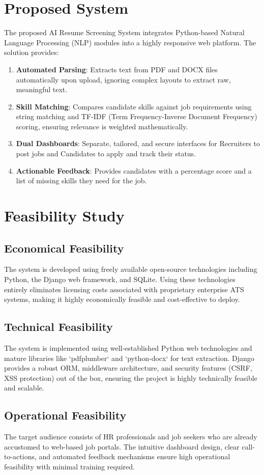 \documentclass[12pt,a4paper]{report}
\begin{document}
\section{Proposed System}
The proposed AI Resume Screening System integrates Python-based Natural Language Processing (NLP) modules into a highly responsive web platform. The solution provides:
\begin{enumerate}
\item \textbf{Automated Parsing}: Extracts text from PDF and DOCX files automatically upon upload, ignoring complex layouts to extract raw, meaningful text.
\item \textbf{Skill Matching}: Compares candidate skills against job requirements using string matching and TF-IDF (Term Frequency-Inverse Document Frequency) scoring, ensuring relevance is weighted mathematically.
\item \textbf{Dual Dashboards}: Separate, tailored, and secure interfaces for Recruiters to post jobs and Candidates to apply and track their status.
\item \textbf{Actionable Feedback}: Provides candidates with a percentage score and a list of missing skills they need for the job.
\end{enumerate}

\section{Feasibility Study}
\subsection{Economical Feasibility}
The system is developed using freely available open-source technologies including Python, the Django web framework, and SQLite. Using these technologies entirely eliminates licensing costs associated with proprietary enterprise ATS systems, making it highly economically feasible and cost-effective to deploy.
\subsection{Technical Feasibility}
The system is implemented using well-established Python web technologies and mature libraries like `pdfplumber` and `python-docx` for text extraction. Django provides a robust ORM, middleware architecture, and security features (CSRF, XSS protection) out of the box, ensuring the project is highly technically feasible and scalable.
\subsection{Operational Feasibility}
The target audience consists of HR professionals and job seekers who are already accustomed to web-based job portals. The intuitive dashboard design, clear call-to-actions, and automated feedback mechanisms ensure high operational feasibility with minimal training required.
\end{document}
